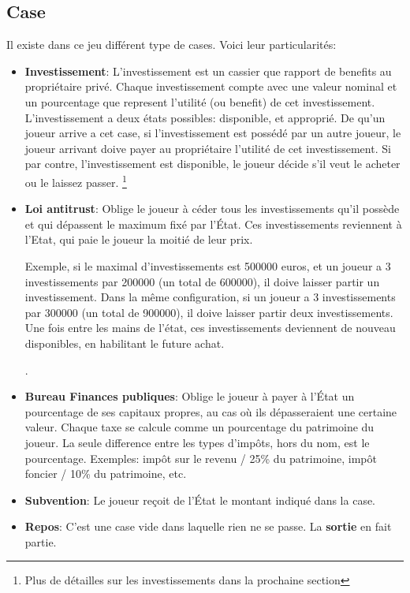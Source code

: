 \documentclass[12pt]{article}
\begin{document}
    
    \subsection{Case}
        Il existe dans ce jeu différent type de cases. Voici leur particularités:
    \begin{itemize}
        \item \textbf{Investissement}: L'investissement est un cassier que rapport de benefits au propriétaire privé.
        		Chaque investissement compte avec une valeur nominal et un pourcentage que represent l'utilité (ou benefit) de cet investissement. 
		L'investissement a deux états possibles: disponible, et approprié.
		De qu'un joueur arrive a cet case,
		 si l'investissement est possédé par un autre joueur, le joueur arrivant doive payer au propriétaire l'utilité de cet investissement.
		Si par contre, l'investissement est disponible, le joueur décide s'il veut le acheter ou le laissez passer. \footnote{ Plus de détailles sur les investissements dans la prochaine section }
		
	
        \item \textbf{Loi antitrust}: Oblige le joueur à céder tous les investissements
    qu'il possède et qui dépassent le maximum fixé par l'État. 
    Ces investissements reviennent à l'Etat, qui paie le joueur la moitié de leur prix. 

    Exemple, si le maximal d'investissements est 500000 euros, et un joueur a 3 investissements par 200000 (un total de 600000), il doive laisser partir un investissement.  
    Dans la même configuration, si un joueur a 3 investissements par 300000 (un total de 900000), il doive laisser partir deux investissements. 
    Une fois entre les mains de l'état, ces investissements deviennent de nouveau disponibles,  
    en habilitant le future achat. 
    
    .
        \item  \textbf{Bureau Finances publiques}: Oblige le joueur à payer à l'État un pourcentage de ses
    capitaux propres, au cas où ils dépasseraient une certaine valeur. Chaque taxe se calcule comme un pourcentage du patrimoine du joueur.
    La seule difference entre les types d'impôts, hors du nom, est le pourcentage. 
    Exemples: impôt sur le revenu / 25\% du patrimoine, impôt foncier / 10\% du patrimoine, etc. 
        \item \textbf{Subvention}: Le joueur reçoit de l'État le montant indiqué dans la case.
        \item \textbf{Repos}: C'est une case vide dans laquelle rien ne se passe. La \textbf{sortie} en fait partie.
    \end{itemize}
    
\end{document}
